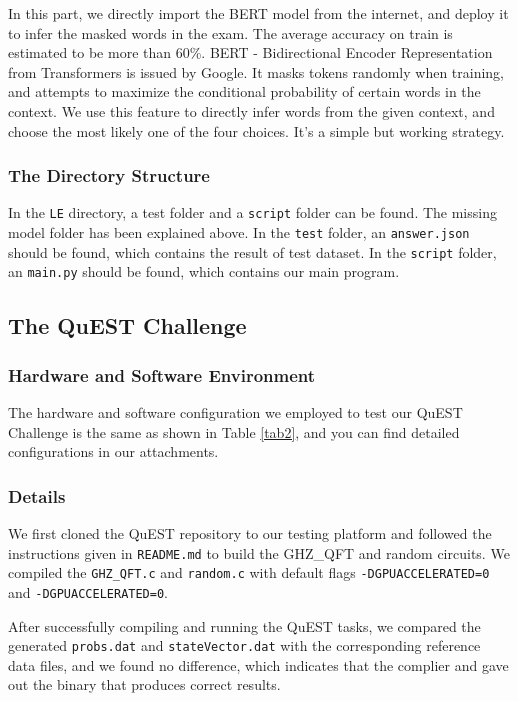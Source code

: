 \documentclass[a4paper, 11pt]{article}
\begin{document}
				In this part, we directly import the BERT\cite{devlin2018bert} model from the internet, and deploy it to infer the masked words in the exam. The average accuracy on train is estimated to be more than 60\%. 
				BERT - Bidirectional Encoder Representation from Transformers is issued by Google. It masks tokens randomly when training, and attempts to maximize the conditional probability of certain words in the context. We use this feature to directly infer words from the given context, and choose the most likely one of the four choices. It's a simple but working strategy. 
				
			\subsubsection{The Directory Structure}
				In the \texttt{LE} directory, a test folder and a \texttt{script} folder can be found. The missing model folder has been explained above. In the \texttt{test} folder, an \texttt{answer.json} should be found, which contains the result of test dataset. In the \texttt{script} folder, an \texttt{main.py} should be found, which contains our main program. 
				
		\subsection{The QuEST Challenge} 
		
			\subsubsection{Hardware and Software Environment}
			
				The hardware and software configuration we employed to test our QuEST Challenge is the same as shown in Table \ref{tab2}, and you can find detailed configurations in our attachments.

			\subsubsection{Details}
			
				We first cloned the QuEST\cite{jones2019quest} repository to our testing platform and followed the instructions given in \texttt{README.md} to build the GHZ\_QFT and random circuits. We compiled the \texttt{GHZ\_QFT.c} and \texttt{random.c} with default flags \texttt{-DGPUACCELERATED=0} and \texttt{-DGPUACCELERATED=0}.
				
				After successfully compiling and running the QuEST tasks, we compared the generated \texttt{probs.dat} and \texttt{stateVector.dat} with the corresponding reference data files, and we found no difference, which indicates that the complier and gave out the binary that produces correct results.
				
\end{document}
